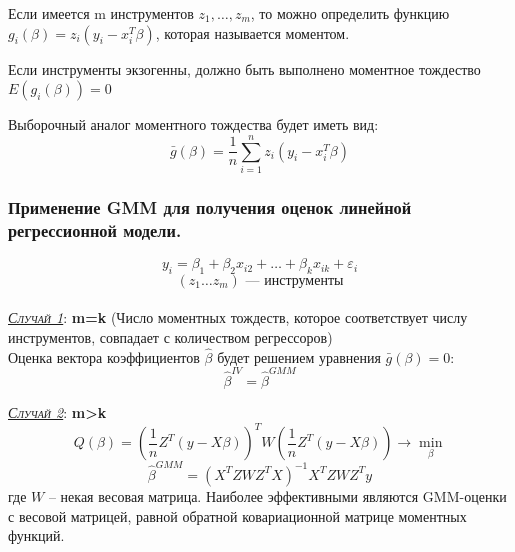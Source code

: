 \documentclass[a0,final]{a0poster}
\begin{document}
\begin{multicols}{4}



\begin{tcolorbox}[colback=red!5!white,colframe=red!75!black]
Если имеется m инструментов $z_1, \ldots,z_m$, то можно определить функцию $g_i(\beta) = z_i(y_i - x_i^T\beta)$, которая называется моментом.
\end{tcolorbox}
\begin{tcolorbox}[colback=green!5!white,colframe=green!75!black]
Если инструменты экзогенны, должно быть выполнено моментное тождество $E(g_i(\beta)) = 0$
\end{tcolorbox}

\begin{tcolorbox}[colback=purple!5!white,colframe=purple!75!black]
Выборочный аналог моментного тождества будет иметь вид:
\[\bar{g}(\beta)= \frac{1}{n}\sum\limits_{i=1}^n z_i(y_i-x_i^T\beta)\]
\end{tcolorbox}

\subsubsection*{\textbf{Применение GMM для получения оценок линейной регрессионной модели.}}
\[y_i=\beta_1+\beta_2x_{i2}+\dotsc+\beta_kx_{ik}+\varepsilon_i\]
\[(z_1 \dots z_m) \text{ — инструменты}\]
\\
\underline{\textsc{\textit{Случай 1}}}: \textbf{m=k} (Число моментных тождеств, которое соответствует числу инструментов, совпадает с количеством регрессоров)\\
Оценка вектора коэффициентов $\hat{\beta}$ будет решением уравнения $\bar{g}(\beta)=0:$
\[\hat{\beta}^{IV} =\hat{\beta}^{GMM}\]

\underline{\textsc{\textit{Случай 2}}}: \textbf{m>k}
\[Q(\beta)={(\frac{1}{n}Z^T(y-X\beta))}^T{W}(\frac{1}{n}Z^T(y-X\beta))\rightarrow\underset{\beta}{\min}\]
\[\hat{\beta}^{GMM}={(X^TZWZ^TX)}^{-1}X^TZWZ^Ty\]
где $W$ – некая весовая матрица.
Наиболее эффективными являются GMM-оценки с весовой матрицей, равной обратной ковариационной матрице моментных функций.


\end{multicols}
\end{document}
